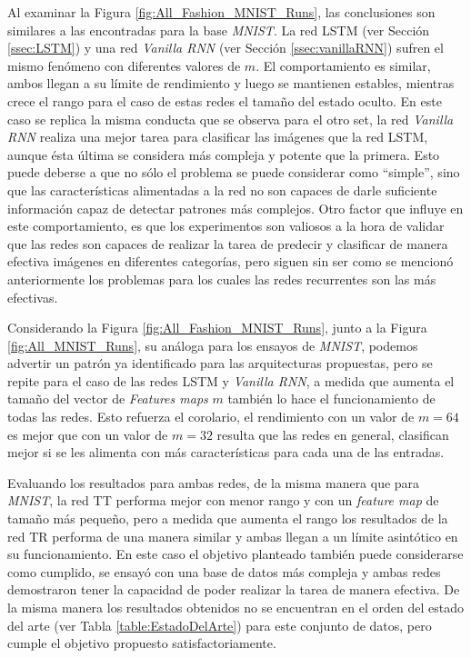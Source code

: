 \documentclass[spanish]{article}
\theoremstyle{definition}
\theoremstyle{remark}
\numberwithin{equation}{section}
\numberwithin{equation}{section} %
\begin{document}
\par
Al examinar la Figura \ref{fig:All_Fashion_MNIST_Runs}, las conclusiones son similares a las encontradas para la base \textit{MNIST}. La red LSTM (ver Sección \ref{ssec:LSTM}) y una red \textit{Vanilla RNN} (ver Sección \ref{ssec:vanillaRNN}) sufren el mismo fenómeno con diferentes valores de $m$. El comportamiento es similar, ambos llegan a su límite de rendimiento y luego se mantienen estables, mientras crece el rango para el caso de estas redes el tamaño del estado oculto. En este caso se replica la misma conducta que se observa para el otro set, la red \textit{Vanilla RNN} realiza una mejor tarea para clasificar las imágenes que la red LSTM, aunque ésta última se considera más compleja y potente que la primera. Esto puede deberse a que no sólo el problema se puede considerar como ``simple'',  sino que las características alimentadas a la red no son capaces de darle suficiente información capaz de detectar patrones más complejos. Otro factor que influye en este comportamiento, es que los experimentos son valiosos a la hora de validar que las redes son capaces de realizar la tarea de predecir y clasificar de manera efectiva imágenes en diferentes categorías, pero siguen sin ser como se mencionó anteriormente los problemas para los cuales las redes recurrentes son las más efectivas.     
\par
Considerando la Figura  \ref{fig:All_Fashion_MNIST_Runs}, junto a la Figura \ref{fig:All_MNIST_Runs}, su análoga para los ensayos de \textit{MNIST}, podemos advertir un patrón ya identificado para las arquitecturas propuestas, pero se repite para el caso de las redes LSTM y \textit{Vanilla RNN}, a medida que aumenta el tamaño del vector de \textit{Features maps} $m$ también lo hace el funcionamiento de todas las redes. Esto refuerza el corolario, el rendimiento con un valor de $m=64$ es mejor que con un valor de $m=32$ resulta que las redes en general, clasifican mejor si se les alimenta con más características para cada una de las entradas.   
\par
Evaluando los resultados para ambas redes, de la misma manera que para \textit{MNIST}, la red TT performa mejor con menor rango y con un \textit{feature map} de tamaño más pequeño, pero a medida que aumenta el rango los resultados de la red TR performa de una manera similar y ambas llegan a un límite asintótico en su funcionamiento. En este caso el objetivo planteado también puede considerarse como cumplido, se ensayó con una base de datos más compleja y ambas redes demostraron tener la capacidad de poder realizar la tarea de manera efectiva. De la misma manera los resultados obtenidos no se encuentran en el orden del estado del arte (ver Tabla \ref{table:EstadoDelArte}) para este conjunto de datos, pero cumple el objetivo propuesto satisfactoriamente. 
\end{document}
